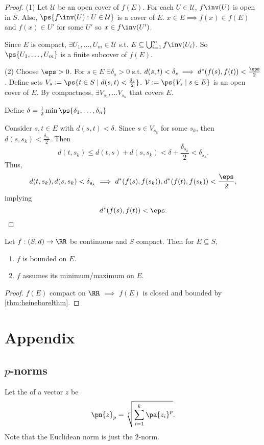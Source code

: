\documentclass[11pt]{scrartcl}
\numberwithin{equation}{section}
\begin{document}
\begin{proof}
    (1) Let $\mathcal U$ be an open cover of $f(E)$. For each 
    $U\in \mathcal{U}$, $f\inv(U)$ is open in $S$. Also, 
    $\ps{f\inv(U):U\in \mathcal{U}}$ is a cover of $E$. $x\in E \implies f(x)\in f(E)$ and $f(x)\in U'$ for some $U'$ so $x\in f\inv(U')$.

    Since $E$ is compact, $\exists U_1,\dots, U_m \in \mathcal{U}$ s.t. 
    $E \subseteq \bigcup_{i=1}^{m}f\inv(U_i)$. So $\ps{U_1,\dots,U_m}$ is a 
    finite subcover of $f(E)$.

    (2) Choose $\eps>0$. For $s\in E$ $\exists \delta_s>0$ s.t. 
    $d(s,t)< \delta_s \implies d^*(f(s),f(t)) < \frac{\eps}{2}$.
    Define sets $V_s := \ps{t\in S \mid d(s,t)<\frac{\delta_s}{2}}$.
    $\mathcal{V}:=\ps{V_s\mid s\in E}$ is an open cover of $E$. 
    By compactness, $\exists V_{s_1},\dots V_{s_n}$ that covers $E$.

    Define $\delta = \frac{1}{2}\min\ps{\delta_1,\dots,\delta_n}$

    Consider $s,t\in E$ with $d(s,t)<\delta$. Since $s\in V_{s_k}$ for 
    some $s_k$, then $d(s,s_k)<\frac{\delta_{s_k}}{2}$. Then 
    \[
        d(t, s_k) \leq d(t,s) + d(s,s_k) < \delta+\frac{\delta_{s_k}}{2} < \delta_{s_k}.
    \]
    Thus, 
    \[
        d(t, s_k), d(s,s_k) < \delta_{s_k} \implies 
        d^*(f(s),f(s_k)), d^*(f(t),f(s_k)) < \frac{\eps}{2},
    \]
    implying 
    \[
        d^*(f(s),f(t)) < \eps.
    \]
\end{proof}

\begin{corollary}
    Let $f : (S,d) \rightarrow \RR$ be continuous and $S$ compact. 
    Then for $E \subseteq S$, 
    \begin{enumerate}
        \item $f$ is bounded on $E$.
        \item $f$ assumes its minimum/maximum on $E$.
    \end{enumerate}
\end{corollary}

\begin{proof}
    $f(E)$ compact on $\RR$ $\implies$ $f(E)$ is closed and bounded 
    by \cref{thm:heineborelthm}.
\end{proof}

\clearpage
\appendix
\section{Appendix}
\subsection{$p$-norms}
Let the  of a vector $z$ be 
\[\pn{z}_p = \sqrt[p]{\sum_{i=1}^{k}\pa{z_i}^p}. \]
Note that the Euclidean norm is just the $2$-norm.
\end{document}
